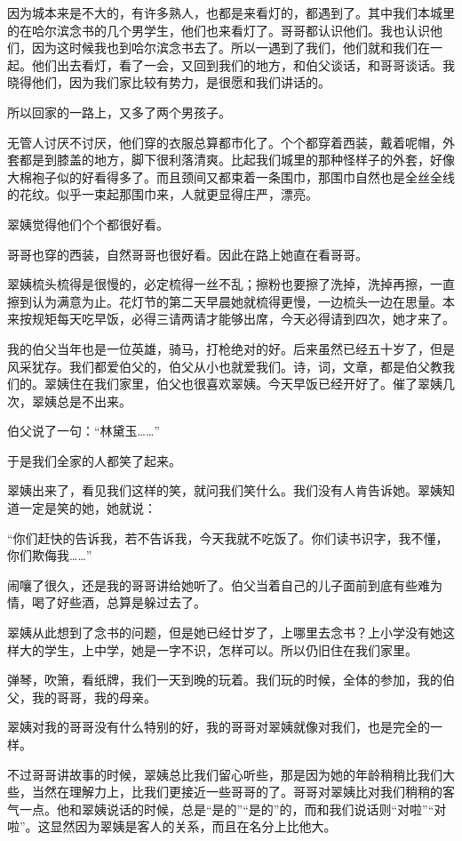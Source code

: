 \par 因为城本来是不大的，有许多熟人，也都是来看灯的，都遇到了。其中我们本城里的在哈尔滨念书的几个男学生，他们也来看灯了。哥哥都认识他们。我也认识他们，因为这时候我也到哈尔滨念书去了。所以一遇到了我们，他们就和我们在一起。他们出去看灯，看了一会，又回到我们的地方，和伯父谈话，和哥哥谈话。我晓得他们，因为我们家比较有势力，是很愿和我们讲话的。
\par 所以回家的一路上，又多了两个男孩子。
\par 无管人讨厌不讨厌，他们穿的衣服总算都市化了。个个都穿着西装，戴着呢帽，外套都是到膝盖的地方，脚下很利落清爽。比起我们城里的那种怪样子的外套，好像大棉袍子似的好看得多了。而且颈间又都束着一条围巾，那围巾自然也是全丝全线的花纹。似乎一束起那围巾来，人就更显得庄严，漂亮。
\par 翠姨觉得他们个个都很好看。
\par 哥哥也穿的西装，自然哥哥也很好看。因此在路上她直在看哥哥。
\par 翠姨梳头梳得是很慢的，必定梳得一丝不乱；擦粉也要擦了洗掉，洗掉再擦，一直擦到认为满意为止。花灯节的第二天早晨她就梳得更慢，一边梳头一边在思量。本来按规矩每天吃早饭，必得三请两请才能够出席，今天必得请到四次，她才来了。
\par 我的伯父当年也是一位英雄，骑马，打枪绝对的好。后来虽然已经五十岁了，但是风采犹存。我们都爱伯父的，伯父从小也就爱我们。诗，词，文章，都是伯父教我们的。翠姨住在我们家里，伯父也很喜欢翠姨。今天早饭已经开好了。催了翠姨几次，翠姨总是不出来。
\par 伯父说了一句：“林黛玉……”
\par 于是我们全家的人都笑了起来。
\par 翠姨出来了，看见我们这样的笑，就问我们笑什么。我们没有人肯告诉她。翠姨知道一定是笑的她，她就说：
\par “你们赶快的告诉我，若不告诉我，今天我就不吃饭了。你们读书识字，我不懂，你们欺侮我……”
\par 闹嚷了很久，还是我的哥哥讲给她听了。伯父当着自己的儿子面前到底有些难为情，喝了好些酒，总算是躲过去了。
\par 翠姨从此想到了念书的问题，但是她已经廿岁了，上哪里去念书？上小学没有她这样大的学生，上中学，她是一字不识，怎样可以。所以仍旧住在我们家里。
\par 弹琴，吹箫，看纸牌，我们一天到晚的玩着。我们玩的时候，全体的参加，我的伯父，我的哥哥，我的母亲。
\par 翠姨对我的哥哥没有什么特别的好，我的哥哥对翠姨就像对我们，也是完全的一样。
\par 不过哥哥讲故事的时候，翠姨总比我们留心听些，那是因为她的年龄稍稍比我们大些，当然在理解力上，比我们更接近一些哥哥的了。哥哥对翠姨比对我们稍稍的客气一点。他和翠姨说话的时候，总是“是的”“是的”的，而和我们说话则“对啦”“对啦”。这显然因为翠姨是客人的关系，而且在名分上比他大。
